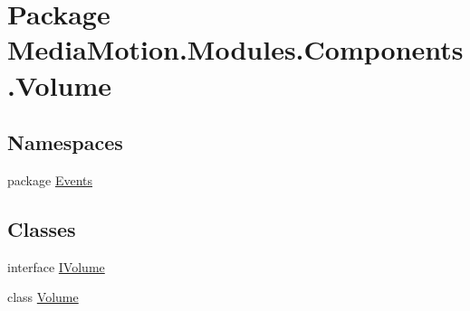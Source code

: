 \hypertarget{namespace_media_motion_1_1_modules_1_1_components_1_1_volume}{\section{Package Media\+Motion.\+Modules.\+Components.\+Volume}
\label{namespace_media_motion_1_1_modules_1_1_components_1_1_volume}
}
\subsection*{Namespaces}
\begin{DoxyCompactItemize}
\item 
package \hyperlink{namespace_media_motion_1_1_modules_1_1_components_1_1_volume_1_1_events}{Events}
\end{DoxyCompactItemize}
\subsection*{Classes}
\begin{DoxyCompactItemize}
\item 
interface \hyperlink{interface_media_motion_1_1_modules_1_1_components_1_1_volume_1_1_i_volume}{I\+Volume}
\item 
class \hyperlink{class_media_motion_1_1_modules_1_1_components_1_1_volume_1_1_volume}{Volume}
\end{DoxyCompactItemize}
